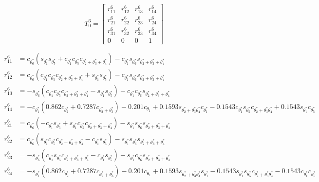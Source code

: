 \documentclass[journal]{new-aiaa}
\begin{document}
\begin{description}
    $$
    T_0^6 = \begin{bmatrix}
        r_{11}^6 & r_{12}^6 & r_{13}^6 & r_{14}^6 \\
        r_{21}^6 & r_{22}^6 & r_{23}^6 & r_{24}^6 \\
        r_{31}^6 & r_{32}^6 & r_{33}^6 & r_{34}^6 \\
        0 & 0 & 0 & 1
    \end{bmatrix}
    $$

    \begin{align*}
        r_{11}^6 &= c_{\theta_6^*}(s_{\theta_1^*}s_{\theta_5^*} + c_{\theta_1^*}c_{\theta_5^*}c_{\theta_2^*+\theta_3^*+\theta_4^*}) - c_{\theta^*_1}s_{\theta_6^*}s_{\theta_2^*+\theta_3^*+\theta_4^*} \\
        r_{12}^6 &= c_{\theta^*_6}(c_{\theta^*_1} c_{\theta^*_5} c_{\theta^*_2+\theta^*_3+\theta^*_4} + s_{\theta^*_1} s_{\theta^*_5}) - c_{\theta^*_1} s_{\theta^*_6} s_{\theta^*_2+\theta^*_3+\theta^*_4} \\
        r_{13}^6 &= -s_{\theta^*_6}(c_{\theta^*_1} c_{\theta^*_5} c_{\theta^*_2+\theta^*_3+\theta^*_4} - s_{\theta^*_1} s_{\theta^*_5}) - c_{\theta^*_1} c_{\theta^*_6} s_{\theta^*_2+\theta^*_3+\theta^*_4} \\
        r_{14}^6 &= -c_{\theta_1^*}(0.862c_{\theta_2^*}+0.7287c_{\theta_2^*+\theta_3^*})-0.201c_{\theta_1} + 0.1593 s_{\theta_2^*+\theta_3^*\theta_4^*} c_{\theta_1^*}-0.1543c_{\theta^*_1}s_{\theta^*_5}c_{\theta_2^*+\theta_3^*\theta_4^*}+0.1543s_{\theta^*_1}c_{\theta^*_5} \\
        r_{21}^6 &= c_{\theta_6^*}(-c_{\theta_1^*}s_{\theta_5^*} + s_{\theta_1^*}c_{\theta_5^*}c_{\theta_2^*+\theta_3^*+\theta_4^*}) - s_{\theta^*_1}s_{\theta_6^*}s_{\theta_2^*+\theta_3^*+\theta_4^*} \\
        r_{22}^6 &=  c_{\theta^*_6}(s_{\theta^*_1} c_{\theta^*_5} c_{\theta^*_2+\theta^*_3+\theta^*_4} - c_{\theta^*_1} s_{\theta^*_5}) - s_{\theta^*_1} s_{\theta^*_6} s_{\theta^*_2+\theta^*_3+\theta^*_4} \\
        r_{23}^6 &= -s_{\theta^*_6}(c_{\theta^*_1} s_{\theta^*_5} c_{\theta^*_2+\theta^*_3+\theta^*_4} - c_{\theta^*_1} s_{\theta^*_5}) - s_{\theta^*_1} c_{\theta^*_6} s_{\theta^*_2+\theta^*_3+\theta^*_4} \\
        r_{24}^6 &= -s_{\theta_1^*}(0.862c_{\theta_2^*}+0.7287c_{\theta_2^*+\theta_3^*})-0.201c_{\theta_1} + 0.1593 s_{\theta_2^*+\theta_3^*\theta_4^*} s_{\theta_1^*}-0.1543s_{\theta^*_1}s_{\theta^*_5}c_{\theta_2^*+\theta_3^*\theta_4^*}-0.1543c_{\theta^*_1}c_{\theta^*_5} \\

\end{align*}
\end{description}
\end{document}
